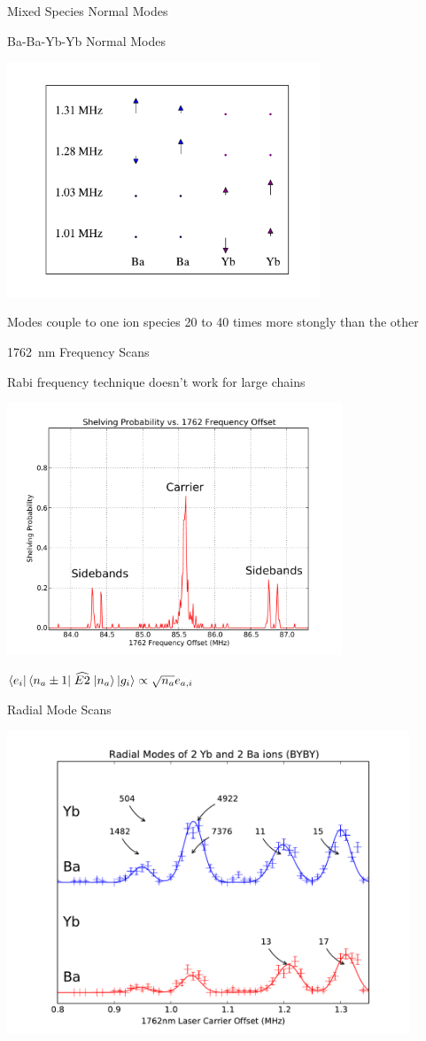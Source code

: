 \documentclass{beamer}
\begin{document}
\begin{frame}{Mixed Species Normal Modes}
	\centerline{\Large Ba-Ba-Yb-Yb Normal Modes}
	\centerline{\includegraphics[width=0.7\textwidth]{BBYYNormalModes}}
	\centerline{Modes couple to one ion species 20 to 40 times more stongly than the other}
\end{frame}

\begin{frame}{1762~nm Frequency Scans}
	\centerline{Rabi frequency technique doesn't work for large chains}
	\centerline{\includegraphics[width=0.75\textwidth]{FullScan}}
	\vfill
	\centerline{${\Large\bra{e_i}\bra{n_{a} \pm 1}} \; \widehat{E2} \; {\Large \ket{n_{a}}\ket{g_i}} \propto \sqrt{n_{a}} e_{a,i}$}
\end{frame}

\begin{frame}{Radial Mode Scans}
	\centerline{\includegraphics[width=0.9\textwidth]{RadialScanBYBY}}
\end{frame}
\end{document}
